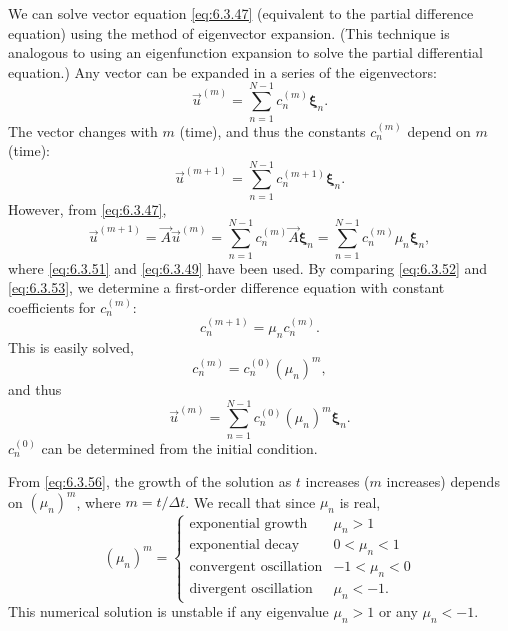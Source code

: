 We can solve vector equation \eqref{eq:6.3.47} (equivalent to the partial difference equation) using the method of eigenvector expansion.  (This technique is analogous to using an eigenfunction expansion to solve the partial differential equation.)  Any vector can be expanded in a series of the eigenvectors:
\begin{equation}
\vec{u}^{(m)} = \sum_{n=1}^{N-1}c_n^{(m)}\boldsymbol{\xi}_n.
\label{eq:6.3.51}
\end{equation}
The vector changes with $m$ (time), and thus the constants $c_n^{(m)}$ depend on $m$ (time):
\begin{equation}
\vec{u}^{(m+1)} = \sum_{n=1}^{N-1}c_n^{(m+1)}\boldsymbol{\xi}_n.
\label{eq:6.3.52}
\end{equation}
However, from \eqref{eq:6.3.47},
\begin{equation}
\vec{u}^{(m+1)} = \vec{A}\vec{u}^{(m)} = \sum_{n=1}^{N-1}c_n^{(m)}\vec{A}\boldsymbol{\xi}_n = \sum_{n=1}^{N-1}c_n^{(m)}\mu_n\boldsymbol{\xi}_n,
\label{eq:6.3.53}
\end{equation}
where \eqref{eq:6.3.51} and \eqref{eq:6.3.49} have been used.  By comparing \eqref{eq:6.3.52} and \eqref{eq:6.3.53}, we determine a first-order difference equation with constant coefficients for $c_n^{(m)}$:
\begin{equation}
c_n^{(m+1)} = \mu_n c_n^{(m)}.
\label{eq:6.3.54}
\end{equation}
This is easily solved,
\begin{equation}
c_n^{(m)} = c_n^{(0)}(\mu_n)^m,
\label{eq:6.3.55}
\end{equation}
and thus
\begin{equation}
\boxed{\vec{u}^{(m)} = \sum_{n=1}^{N-1}c_n^{(0)}(\mu_n)^m\boldsymbol{\xi}_n.}
\label{eq:6.3.56}
\end{equation}
$c_n^{(0)}$ can be determined from the initial condition.

From \eqref{eq:6.3.56}, the growth of the solution as $t$ increases ($m$ increases) depends on $(\mu_n)^m$, where $m = t/\Delta t$.  We recall that since $\mu_n$ is real,
\[
(\mu_n)^m = \begin{cases}
\text{exponential growth} & \mu_n > 1 \\
\text{exponential decay} & 0 < \mu_n < 1 \\
\text{convergent oscillation} & -1 < \mu_n < 0 \\
\text{divergent oscillation} & \mu_n < -1.
\end{cases}
\]
This numerical solution is unstable if any eigenvalue $\mu_n > 1$ or any $\mu_n < -1$.


